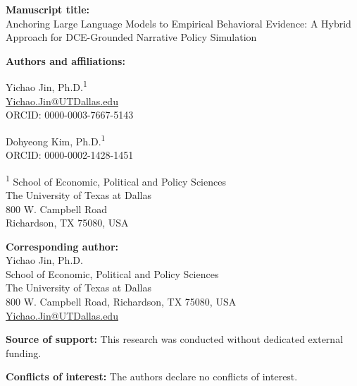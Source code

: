 \documentclass[11pt]{article}
\begin{document}
\noindent\textbf{Manuscript title:}\\
Anchoring Large Language Models to Empirical Behavioral Evidence: A Hybrid Approach for DCE-Grounded Narrative Policy Simulation

\vspace{1.5em}

\noindent\textbf{Authors and affiliations:}

\vspace{0.5em}

\noindent Yichao Jin, Ph.D.\textsuperscript{1}\\
\href{mailto:Yichao.Jin@UTDallas.edu}{Yichao.Jin@UTDallas.edu}\\
ORCID: 0000-0003-7667-5143

\vspace{0.3em}

\noindent Dohyeong Kim, Ph.D.\textsuperscript{1}\\
ORCID: 0000-0002-1428-1451

\vspace{0.8em}

\noindent\textsuperscript{1} School of Economic, Political and Policy Sciences\\
The University of Texas at Dallas\\
800 W. Campbell Road\\
Richardson, TX 75080, USA

\vspace{1.5em}

\noindent\textbf{Corresponding author:}\\
Yichao Jin, Ph.D.\\
School of Economic, Political and Policy Sciences\\
The University of Texas at Dallas\\
800 W. Campbell Road, Richardson, TX 75080, USA\\
\href{mailto:Yichao.Jin@UTDallas.edu}{Yichao.Jin@UTDallas.edu}

\vspace{1.5em}

\noindent\textbf{Source of support:} This research was conducted without dedicated external funding.

\vspace{0.5em}

\noindent\textbf{Conflicts of interest:} The authors declare no conflicts of interest.

\vspace{0.5em}
\end{document}
